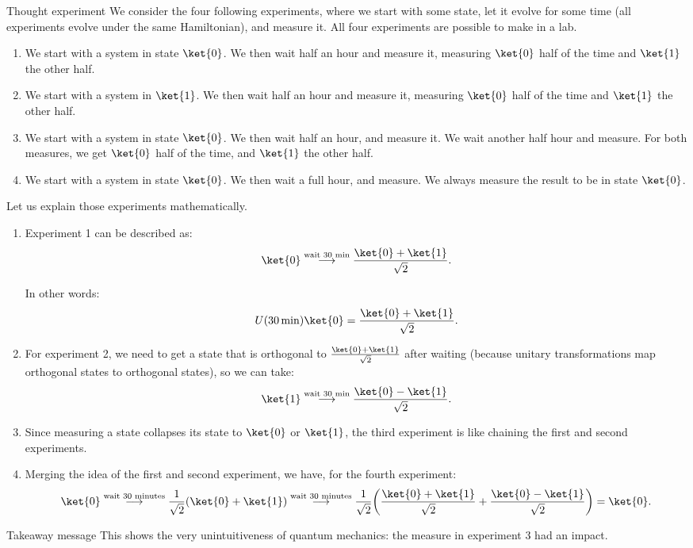 \documentclass[a4paper]{article}
\begin{document}
\begin{parag}{Thought experiment}
    We consider the four following experiments, where we start with some state, let it evolve for some time (all experiments evolve under the same Hamiltonian), and measure it. All four experiments are possible to make in a lab.
    \begin{enumerate}[left=0pt]
        \item We start with a system in state $\ket{0}$. We then wait half an hour and measure it, measuring $\ket{0}$ half of the time and $\ket{1}$ the other half.
        \item We start with a system in $\ket{1}$. We then wait half an hour and measure it, measuring $\ket{0}$ half of the time and $\ket{1}$ the other half.
        \item We start with a system in state $\ket{0}$. We then wait half an hour, and measure it. We wait another half hour and measure. For both measures, we get $\ket{0}$ half of the time, and $\ket{1}$ the other half.
        \item We start with a system in state $\ket{0}$. We then wait a full hour, and measure. We always measure the result to be in state $\ket{0}$.
    \end{enumerate}

    Let us explain those experiments mathematically.
    \begin{enumerate}[left=0pt]
        \item Experiment 1 can be described as: 
        \[\ket{0} \over{\longrightarrow}{wait 30 min} \frac{\ket{0} + \ket{1}}{\sqrt{2}}.\]

        In other words: 
        \[U\left(\SI{30}{\minute}\right) \ket{0} = \frac{\ket{0} + \ket{1}}{\sqrt{2}}.\]
        
        \item For experiment 2, we need to get a state that is orthogonal to $\frac{\ket{0} + \ket{1}}{\sqrt{2}}$ after waiting (because unitary transformations map orthogonal states to orthogonal states), so we can take: 
        \[\ket{1} \over{\longrightarrow}{wait 30 min} \frac{\ket{0} - \ket{1}}{\sqrt{2}}.\]

        \item Since measuring a state collapses its state to $\ket{0}$ or $\ket{1}$, the third experiment is like chaining the first and second experiments.

        \item Merging the idea of the first and second experiment, we have, for the fourth experiment:
        \[\ket{0} \over{\longrightarrow}{wait 30 minutes} \frac{1}{\sqrt{2}} \left(\ket{0} + \ket{1}\right) \over{\longrightarrow}{wait 30 minutes} \frac{1}{\sqrt{2}}\left(\frac{\ket{0} + \ket{1}}{\sqrt{2}} + \frac{\ket{0} - \ket{1}}{\sqrt{2}}\right) = \ket{0}.\]
    \end{enumerate}

    \begin{subparag}{Takeaway message}
        This shows the very unintuitiveness of quantum mechanics: the measure in experiment 3 had an impact.
    \end{subparag}
\end{parag}
\end{document}
